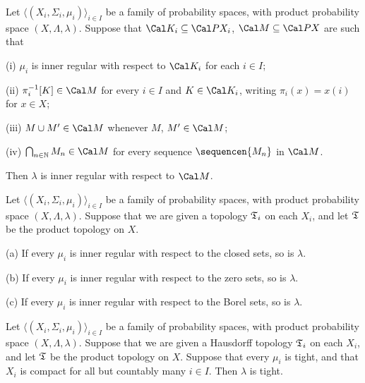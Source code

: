  Let $\langle(X_i,\Sigma_i,\mu_i)\rangle_{i\in I}$
be a family of probability spaces, with product probability space
$(X,\Lambda,\lambda)$.   Suppose that
$\Cal K_i\subseteq\Cal PX_i$, $\Cal M\subseteq\Cal PX$ are such that

\quad (i) $\mu_i$ is inner regular with respect to $\Cal K_i$ for each
$i\in I$;

\quad (ii) $\pi_i^{-1}[K]\in\Cal M$ for every $i\in I$ and $K\in\Cal K_i$,
writing $\pi_i(x)=x(i)$ for $x\in X$;

\quad (iii) $M\cup M'\in\Cal M$ whenever $M$, $M'\in\Cal M$;

\quad (iv) $\bigcap_{n\in\Bbb N}M_n\in\Cal M$ for every sequence
$\sequencen{M_n}$ in $\Cal M$.

\noindent Then $\lambda$ is inner regular with respect to $\Cal M$.


 Let
$\langle(X_i,\Sigma_i,\mu_i)\rangle_{i\in I}$ be a family of probability
spaces, with product probability space
$(X,\Lambda,\lambda)$.   Suppose that we are given a topology
$\frak T_i$ on each $X_i$, and let $\frak T$ be the product topology on
$X$.

(a) If every $\mu_i$ is inner regular with respect to the closed sets,
so is $\lambda$.

(b) If every $\mu_i$ is inner regular with respect to the zero sets, so
is $\lambda$.

(c) If every $\mu_i$ is inner regular with respect to the Borel sets, so
is $\lambda$.


 Let
$\langle(X_i,\Sigma_i,\mu_i)\rangle_{i\in I}$ be a family of probability
spaces, with product probability space
$(X,\Lambda,\lambda)$.   Suppose that we are given a Hausdorff topology
$\frak T_i$ on each $X_i$, and let $\frak T$ be the product topology on
$X$.   Suppose that every $\mu_i$ is tight, and that $X_i$ is compact
for all but countably many $i\in I$.   Then $\lambda$ is tight.

